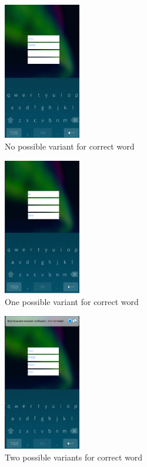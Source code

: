 \documentclass[conference]{IEEEtran}
\begin{document}
\begin{figure}[!hbt]
	\centering
 	\includegraphics[width=0.3\textwidth]{images/0.png}
	\caption{No possible variant for correct word}
	\label{zero}
\end{figure}

\begin{figure}[!hbt]
	\centering
	\includegraphics[width=0.3\textwidth]{images/1.png}
	\caption{One possible variant for correct word}
	\label{one}
\end{figure}


\begin{figure}[!hbt]
	\centering
	\includegraphics[width=0.3\textwidth]{images/2.png}
	\caption{Two possible variants for correct word
	}
	\label{two}
\end{figure}
\end{document}
